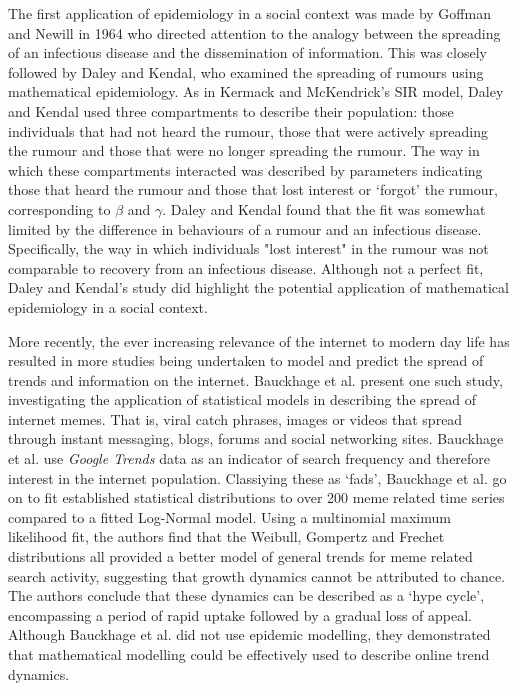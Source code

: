 The first application of epidemiology in a social context was made by Goffman and Newill in 1964 who directed attention to the analogy between the spreading of an infectious disease and the dissemination of information.\cite{goffman} This was closely followed by Daley and Kendal, who examined the spreading of rumours using mathematical epidemiology.\cite{goffman} As in Kermack and McKendrick's SIR model, Daley and Kendal used three compartments to describe their population: those individuals that had not heard the rumour, those that were actively spreading the rumour and those that were no longer spreading the rumour. The way in which these compartments interacted was described by parameters indicating those that heard the rumour and those that lost interest or `forgot' the rumour, corresponding to $\beta$ and $\gamma$. Daley and Kendal found that the fit was somewhat limited by the difference in behaviours of a rumour and an infectious disease. Specifically, the way in which individuals "lost interest"  in the rumour was not comparable to recovery from an infectious disease. Although not a perfect fit, Daley and Kendal's study did highlight the potential application of mathematical epidemiology in a social context.

More recently, the ever increasing relevance of the internet to modern day life has resulted in more studies being undertaken to model and predict the spread of trends and information on the internet. Bauckhage et al. present one such study, investigating the application of statistical models in describing the spread of internet memes.\cite{meme} That is, viral catch phrases, images or videos that spread through instant messaging, blogs, forums and social networking sites. Bauckhage et al. use \emph{Google Trends} data as an indicator of search frequency and therefore interest in the internet population. Classiying these as `fads', Bauckhage et al. go on to fit established statistical distributions to over 200 meme related time series compared to a fitted Log-Normal model. Using a multinomial maximum likelihood fit, the authors find that the Weibull, Gompertz and Frechet distributions all provided a better model of general trends for meme related search activity, suggesting that growth dynamics cannot be attributed to chance. The authors conclude that these dynamics can be described as a `hype cycle', encompassing a period of rapid uptake followed by a gradual loss of appeal. Although Bauckhage et al. did not use epidemic modelling, they demonstrated that mathematical modelling could be effectively used to describe online trend dynamics.

